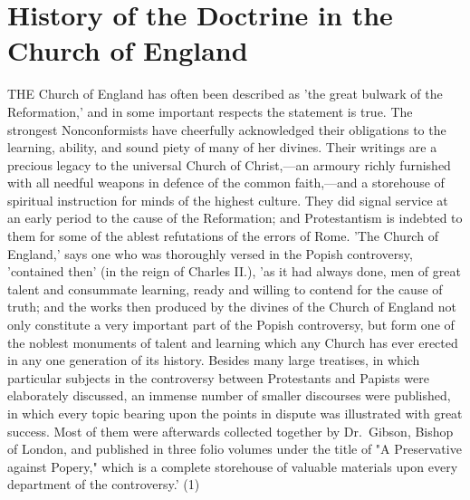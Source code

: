 \documentclass[
]{book}
\begin{document}
\hypertarget{history-of-the-doctrine-in-the-church-of-england}{%
\chapter{History of the Doctrine in the Church of England}\label{history-of-the-doctrine-in-the-church-of-england}}

THE Church of England has often been described as 'the great bulwark of the Reformation,' and in some important respects the statement is true. The strongest Nonconformists have cheerfully acknowledged their obligations to the learning, ability, and sound piety of many of her divines. Their writings are a precious legacy to the universal Church of Christ,---an armoury richly furnished with all needful weapons in defence of the common faith,---and a storehouse of spiritual instruction for minds of the highest culture. They did signal service at an early period to the cause of the Reformation; and Protestantism is indebted to them for some of the ablest refutations of the errors of Rome. 'The Church of England,' says one who was thoroughly versed in the Popish controversy, 'contained then' (in the reign of Charles II.), 'as it had always done, men of great talent and consummate learning, ready and willing to contend for the cause of truth; and the works then produced by the divines of the Church of England not only constitute a very important part of the Popish controversy, but form one of the noblest monuments of talent and learning which any Church has ever erected in any one generation of its history. Besides many large treatises, in which particular subjects in the controversy between Protestants and Papists were elaborately discussed, an immense number of smaller discourses were published, in which every topic bearing upon the points in dispute was illustrated with great success. Most of them were afterwards collected together by Dr.~Gibson, Bishop of London, and published in three folio volumes under the title of "A Preservative against Popery," which is a complete storehouse of valuable materials upon every department of the controversy.' (1)
\end{document}
